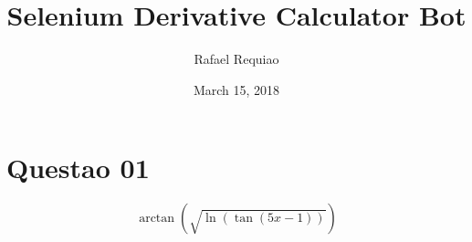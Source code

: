\documentclass[12pt,a4paper]{memoir}      %
\title{Selenium Derivative Calculator Bot}
\author{Rafael Requiao}
\date{March 15, 2018}
\begin{document}
\maketitle 

\section{Questao 01}


$$\arctan\left(\sqrt{\ln\left(\tan\left(5x-1\right)\right)}\right)$$
\end{document}
